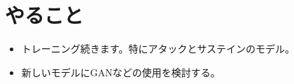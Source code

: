 \documentclass[a4paper, 12pt]{article}
\begin{document}


\section*{やること}
\begin{itemize}
    \item トレーニング続きます。特にアタックとサステインのモデル。
    \item 新しいモデルにGANなどの使用を検討する。
\end{itemize}



\end{document}
